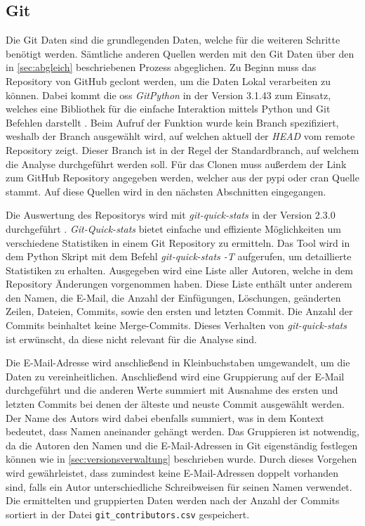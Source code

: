 \subsection{Git}
\label{subsec:datenbeschaffung_git}
Die Git Daten sind die grundlegenden Daten, welche für die weiteren Schritte benötigt werden.
Sämtliche anderen Quellen werden mit den Git Daten über den in \autoref{sec:abgleich} beschriebenen Prozess abgeglichen.
Zu Beginn muss das Repository von GitHub geclont werden, um die Daten Lokal verarbeiten zu können.
Dabei kommt die \gls{oss} \emph{GitPython} in der Version 3.1.43 zum Einsatz, welches eine Bibliothek für die einfache Interaktion mittels Python und Git Befehlen darstellt \autocite{thiel_gitpython-developersgitpython_2024}.
Beim Aufruf der Funktion wurde kein Branch spezifiziert, weshalb der Branch ausgewählt wird, auf welchen aktuell der \emph{HEAD} vom remote Repository zeigt.
Dieser Branch ist in der Regel der Standardbranch, auf welchem die Analyse durchgeführt werden soll.
Für das Clonen muss außerdem der Link zum GitHub Repository angegeben werden, welcher aus der \gls{pypi} oder \gls{cran} Quelle stammt.
Auf diese Quellen wird in den nächsten Abschnitten eingegangen.

Die Auswertung des Repositorys wird mit \emph{git-quick-stats} in der Version 2.3.0 durchgeführt \autocite{arzzen_git-quick-statsgit-quick-stats_2021}.
\emph{Git-Quick-stats} bietet einfache und effiziente Möglichkeiten um verschiedene Statistiken in einem Git Repository zu ermitteln.
Das Tool wird in dem Python Skript mit dem Befehl \emph{git-quick-stats -T} aufgerufen, um detaillierte Statistiken zu erhalten.
Ausgegeben wird eine Liste aller Autoren, welche in dem Repository Änderungen vorgenommen haben.
Diese Liste enthält unter anderem den Namen, die E-Mail, die Anzahl der Einfügungen, Löschungen, geänderten Zeilen, Dateien, Commits, sowie den ersten und letzten Commit.
Die Anzahl der Commits beinhaltet keine Merge-Commits.
Dieses Verhalten von \emph{git-quick-stats} ist erwünscht, da diese nicht relevant für die Analyse sind.

Die E-Mail-Adresse wird anschließend in Kleinbuchstaben umgewandelt, um die Daten zu vereinheitlichen.
Anschließend wird eine Gruppierung auf der E-Mail durchgeführt und die anderen Werte summiert mit Ausnahme des ersten und letzten Commits bei denen der älteste und neuste Commit ausgewählt werden.
Der Name des Autors wird dabei ebenfalls summiert, was in dem Kontext bedeutet, dass Namen aneinander gehängt werden.
Das Gruppieren ist notwendig, da die Autoren den Namen und die E-Mail-Adressen in Git eigenständig festlegen können wie in \autoref{sec:versionsverwaltung} beschrieben wurde.
Durch dieses Vorgehen wird gewährleistet, dass zumindest keine E-Mail-Adressen doppelt vorhanden sind, falls ein Autor unterschiedliche Schreibweisen für seinen Namen verwendet.
Die ermittelten und gruppierten Daten werden nach der Anzahl der Commits sortiert in der Datei \texttt{git\_contributors.csv} gespeichert.

